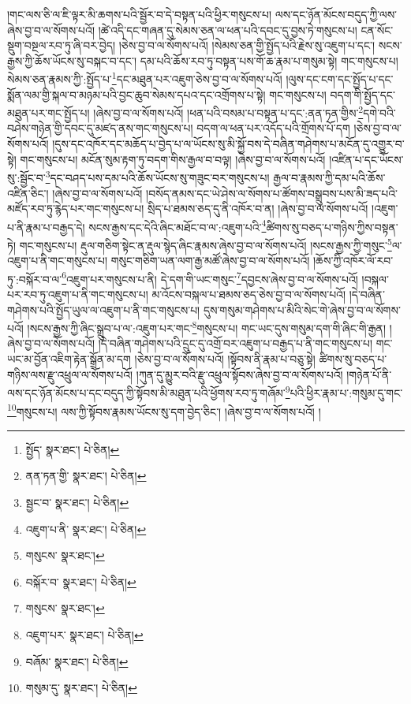།གང་ལས་ཅི་ལ་ཇི་ལྟར་མི་ཆགས་པའི་སྦྱོར་བ་དེ་བསྟན་པའི་ཕྱིར་གསུངས་པ། ལས་དང་ཉོན་མོངས་བདུད་ཀྱི་ལས་ཞེས་བྱ་བ་ལ་སོགས་པའོ། །ཚེ་འདི་དང་གཞན་དུ་སེམས་ཅན་ལ་ཕན་པའི་དབང་དུ་བྱས་ཏེ་གསུངས་པ། ངན་སོང་སྡུག་བསྔལ་རབ་ཏུ་ཞི་བར་བྱེད། །ཅེས་བྱ་བ་ལ་སོགས་པའོ། །སེམས་ཅན་གྱི་སྤྱོད་པའི་རྗེས་སུ་འཇུག་པ་དང་། སངས་རྒྱས་ཀྱི་ཆོས་ཡོངས་སུ་བསྐང་བ་དང་། དམ་པའི་ཆོས་རབ་ཏུ་བསྟན་པས་གོ་ཆ་རྣམ་པ་གསུམ་སྟེ། གང་གསུངས་པ། སེམས་ཅན་རྣམས་ཀྱི་:སྤྱོད་པ་\footnote{སྤྱོད་  སྣར་ཐང་།  པེ་ཅིན། }དང་མཐུན་པར་འཇུག་ཅེས་བྱ་བ་ལ་སོགས་པའོ། །ལུས་དང་ངག་དང་སྤྱོད་པ་དང་སྨོན་ལམ་གྱི་སྐལ་བ་མཉམ་པའི་བྱང་ཆུབ་སེམས་དཔའ་དང་འགྲོགས་པ་སྟེ། གང་གསུངས་པ། བདག་གི་སྤྱོད་དང་མཐུན་པར་གང་སྤྱོད་པ། །ཞེས་བྱ་བ་ལ་སོགས་པའོ། །ཕན་པའི་བསམ་པ་བསྟན་པ་དང་:ནན་ཏན་གྱིས་\footnote{ནན་ཏན་གྱི་  སྣར་ཐང་།  པེ་ཅིན། }དགེ་བའི་བཤེས་གཉེན་གྱི་དབང་དུ་མཛད་ནས་གང་གསུངས་པ། བདག་ལ་ཕན་པར་འདོད་པའི་གྲོགས་པོ་དག །ཅེས་བྱ་བ་ལ་སོགས་པའོ། །དུས་དང་འཁོར་དང་མཆོད་པ་བྱེད་པ་ལ་ཡོངས་སུ་མི་སྐྱོ་བས་དེ་བཞིན་གཤེགས་པ་མངོན་དུ་འགྱུར་བ་སྟེ། གང་གསུངས་པ། མངོན་སུམ་རྟག་ཏུ་བདག་གིས་རྒྱལ་བ་བལྟ། །ཞེས་བྱ་བ་ལ་སོགས་པའོ། །འཛིན་པ་དང་ཡོངས་སུ་:སྦྱོང་བ་\footnote{སྦྱང་བ་  སྣར་ཐང་།  པེ་ཅིན། }དང་བཤད་པས་དམ་པའི་ཆོས་ཡོངས་སུ་གཟུང་བར་གསུངས་པ། རྒྱལ་བ་རྣམས་ཀྱི་དམ་པའི་ཆོས་འཛིན་ཅིང་། །ཞེས་བྱ་བ་ལ་སོགས་པའོ། །བསོད་ནམས་དང་ཡེ་ཤེས་ལ་སོགས་པ་ཚོགས་བསྒྲུབས་པས་མི་ཟད་པའི་མཛོད་རབ་ཏུ་རྙེད་པར་གང་གསུངས་པ། སྲིད་པ་ཐམས་ཅད་དུ་ནི་འཁོར་བ་ན། །ཞེས་བྱ་བ་ལ་སོགས་པའོ། །འཇུག་པ་ནི་རྣམ་པ་བརྒྱད་དེ། སངས་རྒྱས་དང་དེའི་ཞིང་མཐོང་བ་ལ་:འཇུག་པའི་\footnote{འཇུག་པ་ནི་  སྣར་ཐང་།  པེ་ཅིན། }ཚིགས་སུ་བཅད་པ་གཉིས་ཀྱིས་བསྟན་ཏེ། གང་གསུངས་པ། རྡུལ་གཅིག་སྟེང་ན་རྡུལ་སྙེད་ཞིང་རྣམས་ཞེས་བྱ་བ་ལ་སོགས་པའོ། །སངས་རྒྱས་ཀྱི་གསུང་\footnote{གསུངས་  སྣར་ཐང་། }ལ་འཇུག་པ་ནི་གང་གསུངས་པ། གསུང་གཅིག་ཡན་ལག་རྒྱ་མཚོ་ཞེས་བྱ་བ་ལ་སོགས་པའོ། །ཆོས་ཀྱི་འཁོར་ལོ་རབ་ཏུ་:བསྐོར་བ་ལ་\footnote{བསྐོར་བ་  སྣར་ཐང་།  པེ་ཅིན། }འཇུག་པར་གསུངས་པ་ནི། དེ་དག་གི་ཡང་གསུང་\footnote{གསུངས་  སྣར་ཐང་། }དབྱངས་ཞེས་བྱ་བ་ལ་སོགས་པའོ། །བསྐལ་པར་རབ་ཏུ་འཇུག་པ་ནི་གང་གསུངས་པ། མ་འོངས་བསྐལ་པ་ཐམས་ཅད་ཅེས་བྱ་བ་ལ་སོགས་པའོ། །དེ་བཞིན་གཤེགས་པའི་སྤྱོད་ཡུལ་ལ་འཇུག་པ་ནི་གང་གསུངས་པ། དུས་གསུམ་གཤེགས་པ་མིའི་སེང་གེ་ཞེས་བྱ་བ་ལ་སོགས་པའོ། །སངས་རྒྱས་ཀྱི་ཞིང་སྒྲུབ་པ་ལ་:འཇུག་པར་གང་\footnote{འཇུག་པར་  སྣར་ཐང་།  པེ་ཅིན། }གསུངས་པ། གང་ཡང་དུས་གསུམ་དག་གི་ཞིང་གི་རྒྱན། །ཞེས་བྱ་བ་ལ་སོགས་པའོ། །དེ་བཞིན་གཤེགས་པའི་དྲུང་དུ་འགྲོ་བར་འཇུག་པ་བརྒྱད་པ་ནི་གང་གསུངས་པ། གང་ཡང་མ་བྱོན་འཇིག་རྟེན་སྒྲོན་མ་དག །ཅེས་བྱ་བ་ལ་སོགས་པའོ། །སྟོབས་ནི་རྣམ་པ་བཅུ་སྟེ། ཚིགས་སུ་བཅད་པ་གཉིས་ལས་རྫུ་འཕྲུལ་ལ་སོགས་པའོ། །ཀུན་དུ་མྱུར་བའི་རྫུ་འཕྲུལ་སྟོབས་ཞེས་བྱ་བ་ལ་སོགས་པའོ། །གཉེན་པོ་ནི་ལས་དང་ཉོན་མོངས་པ་དང་བདུད་ཀྱི་སྟོབས་མི་མཐུན་པའི་ཕྱོགས་རབ་ཏུ་གཞོམ་\footnote{བཞོམ་  སྣར་ཐང་།  པེ་ཅིན། }པའི་ཕྱིར་རྣམ་པ་:གསུམ་དུ་གང་\footnote{གསུམ་དུ་  སྣར་ཐང་།  པེ་ཅིན། }གསུངས་པ། ལས་ཀྱི་སྟོབས་རྣམས་ཡོངས་སུ་དག་བྱེད་ཅིང་། །ཞེས་བྱ་བ་ལ་སོགས་པའོ། །
